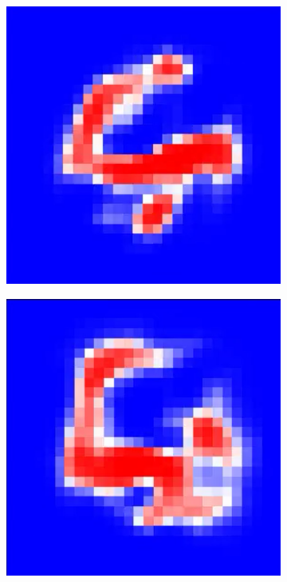 \documentclass[a4paper]{article}
\begin{document}
\begin{figure}[ht]
\begin{subfigure}[b]{0.095\textwidth}
  \end{subfigure}
    \begin{subfigure}[b]{0.095\textwidth}
   \includegraphics[width=\linewidth]{figures/4.png}
  \end{subfigure}
    \begin{subfigure}[b]{0.095\textwidth}
   \includegraphics[width=\linewidth]{figures/5.png}

\end{subfigure}
\end{figure}
\end{document}
